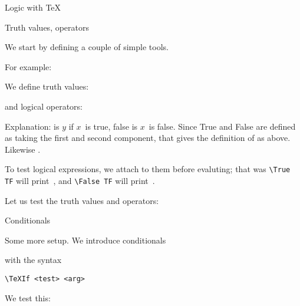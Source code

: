 

 {Logic with \TeX}

 {Truth values, operators}

We start by defining a couple of simple tools.
\begin{inputwithcode}
\def\Ignore#1{}
\def\Identity#1{#1}
\def\First#1#2{#1}
\def\Second#1#2{#2}
\end{inputwithcode}

For example:
\begin{logix}
\end{logix}

We define truth values:
\begin{inputwithcode}
\let\True=\First
\let\False=\Second
\end{inputwithcode}
and logical operators:
\begin{inputwithcode}
\def\And#1#2{#1{#2}\False}
\def\Or#1#2{#1\True{#2}}
\def\Twiddle#1#2#3{#1{#3}{#2}}
\let\Not=\Twiddle
\end{inputwithcode}
Explanation:  is $y$ if $x$~is true, false is $x$~is
false. Since True and False are defined as taking the first and second
component, that gives the definition of  as above. Likewise .

To test logical expressions, we attach  to them before
evaluting; that was \verb+\True TF+ will print~, and
\verb+\False TF+ will print~.

Let us test the truth values and operators:
\begin{logixx}


\end{logixx}

 {Conditionals}

Some more setup. We introduce conditionals
with the syntax
\begin{verbatim}
\TeXIf <test> <arg>
\end{verbatim}
We test this:
\begin{logix}
\end{logix}

